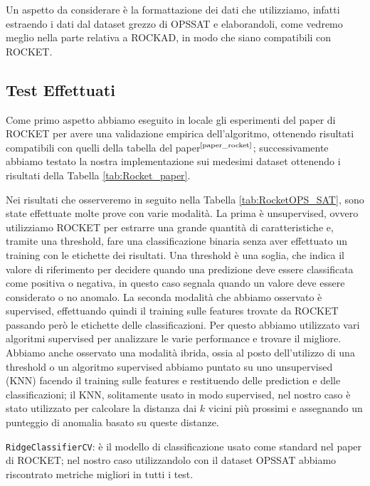 Un aspetto da considerare è la formattazione dei dati che utilizziamo, infatti estraendo i dati dal dataset grezzo di OPS\textunderscore SAT e elaborandoli, come vedremo meglio nella parte relativa a ROCKAD, in modo che siano compatibili con ROCKET.

\subsection{Test Effettuati}
Come primo aspetto abbiamo eseguito in locale gli esperimenti del paper di ROCKET per avere una validazione empirica dell'algoritmo, ottenendo risultati compatibili con quelli della tabella del paper$^{\text{\cite{paper_rocket}}}$; successivamente abbiamo testato la nostra implementazione sui medesimi dataset ottenendo i risultati della Tabella \ref{tab:Rocket_paper}.

\pagebreak

Nei risultati che osserveremo in seguito nella Tabella \ref{tab:RocketOPS_SAT}, sono state effettuate molte prove con varie modalità.
La prima è unsupervised, ovvero utilizziamo ROCKET per estrarre una grande quantità di caratteristiche e, tramite una threshold, fare una classificazione binaria senza aver effettuato un training con le etichette dei risultati.
Una threshold è una soglia, che indica il valore di riferimento per decidere quando una predizione deve essere classificata come positiva o negativa, in questo caso segnala quando un valore deve essere considerato o no anomalo.
La seconda modalità che abbiamo osservato è supervised, effettuando quindi il training sulle features trovate da ROCKET passando però le etichette delle classificazioni.
Per questo abbiamo utilizzato vari algoritmi supervised per analizzare le varie performance e trovare il migliore.
Abbiamo anche osservato una modalità ibrida, ossia al posto dell'utilizzo di una threshold o un algoritmo supervised abbiamo puntato su uno unsupervised (KNN) facendo il training sulle features e restituendo delle prediction e delle classificazioni; il KNN, solitamente usato in modo supervised, nel nostro caso è stato utilizzato per calcolare la distanza dai $k$ vicini più prossimi e assegnando un punteggio di anomalia basato su queste distanze.

\texttt{RidgeClassifierCV}: è il modello di classificazione usato come standard nel paper di ROCKET; nel nostro caso utilizzandolo con il dataset OPS\textunderscore SAT abbiamo riscontrato metriche migliori in tutti i test.


